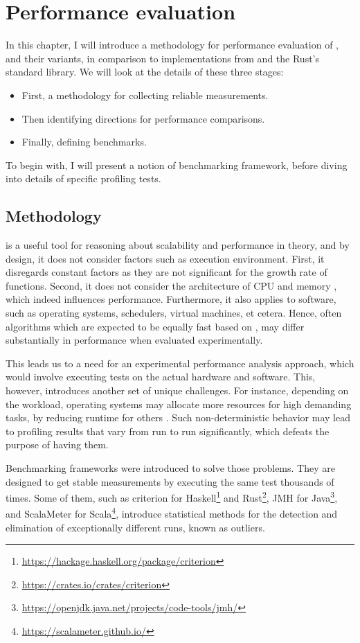 \chapter{Performance evaluation}
In this chapter, I will introduce a methodology for performance evaluation of \rrbvec{}, \pvec{} and their variants, in comparison to implementations from \imrsvec{} and the Rust's standard library. We will look at the details of these three stages:

\begin{itemize}
    \item First, a methodology for collecting reliable measurements. 
    \item Then identifying directions for performance comparisons. 
    \item Finally, defining benchmarks. 
\end{itemize}

To begin with, I will present a notion of benchmarking framework, before diving into details of specific profiling tests. 

\section{Methodology}
\bigochar{} is a useful tool for reasoning about scalability and performance in theory, and by design, it does not consider factors such as execution environment. First, it disregards constant factors as they are not significant for the growth rate of functions. Second, it does not consider the architecture of CPU and memory \cite{what-programmer-should-know-about-memory}, which indeed influences performance. Furthermore, it also applies to software, such as operating systems, schedulers, virtual machines, et cetera. Hence, often algorithms which are expected to be equally fast based on \bigochar{}, may differ substantially in performance when evaluated experimentally. 

This leads us to a need for an experimental performance analysis approach, which would involve executing tests on the actual hardware and software. This, however, introduces another set of unique challenges. For instance, depending on the workload, operating systems may allocate more resources for high demanding tasks, by reducing runtime for others \cite{statistically-rigorous-java-performance-evaluation}. Such non-deterministic behavior may lead to profiling results that vary from run to run significantly, which defeats the purpose of having them. 

Benchmarking frameworks were introduced to solve those problems. They are designed to get stable measurements by executing the same test thousands of times. Some of them, such as criterion for Haskell\footnote{\url{https://hackage.haskell.org/package/criterion}} and Rust\footnote{\url{https://crates.io/crates/criterion}}, JMH for Java\footnote{\url{https://openjdk.java.net/projects/code-tools/jmh/}}, and ScalaMeter for Scala\footnote{\url{https://scalameter.github.io/}}, introduce statistical methods for the detection and elimination of exceptionally different runs, known as outliers. 

